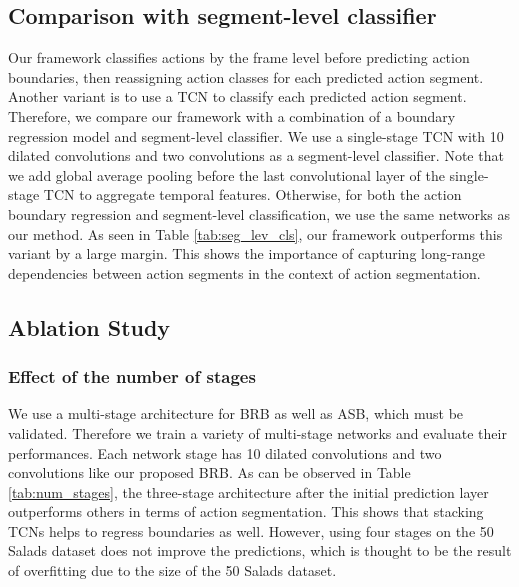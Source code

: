 \documentclass[10pt,twocolumn,letterpaper]{article}
\begin{document}
\subsection{Comparison with segment-level classifier}
\label{sec:seg_lev_cls}
Our framework classifies actions by the frame level before predicting action boundaries, then reassigning action classes for each predicted action segment.
Another variant is to use a TCN to classify each predicted action segment.
Therefore, we compare our framework with a combination of a boundary regression model and segment-level classifier.
We use a single-stage TCN with 10 dilated convolutions and two convolutions as a segment-level classifier.
Note that we add global average pooling before the last convolutional layer of the single-stage TCN to aggregate temporal features.
Otherwise, for both the action boundary regression and segment-level classification, we use the same networks as our method.
As seen in Table \ref{tab:seg_lev_cls}, our framework outperforms this variant by a large margin.
This shows the importance of capturing long-range dependencies between action segments in the context of action segmentation.

\subsection{Ablation Study}
\subsubsection{Effect of the number of stages}
\label{sec:num_stages}
\vspace{-2pt}
We use a multi-stage architecture for BRB as well as ASB, which must be validated.
Therefore we train a variety of multi-stage networks and evaluate their performances.
Each network stage has 10 dilated convolutions and two convolutions like our proposed BRB.
As can be observed in Table \ref{tab:num_stages}, the three-stage architecture after the initial prediction layer outperforms others in terms of action segmentation.
This shows that stacking TCNs helps to regress boundaries as well.
However, using four stages on the 50 Salads dataset does not improve the predictions, which is thought to be the result of overfitting due to the size of the 50 Salads dataset.
\end{document}
